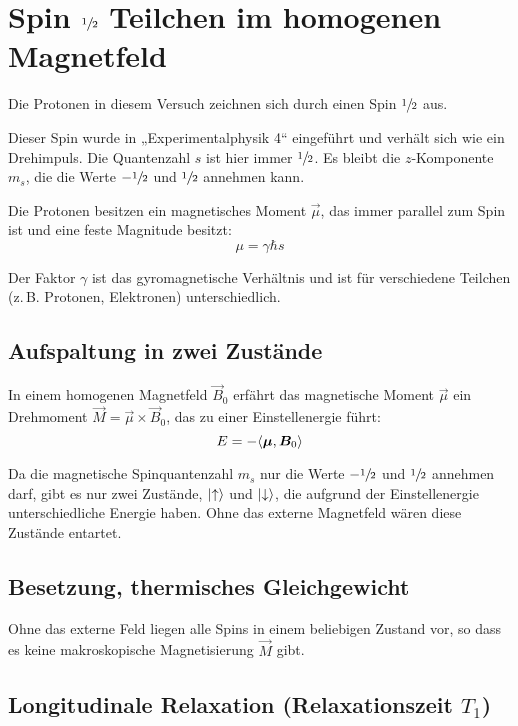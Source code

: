 \nocite{meschede-gerthsen_24}

\nocite{physik412-Anleitung}

\section{Spin $\sfrac12$ Teilchen im homogenen Magnetfeld}

Die Protonen in diesem Versuch zeichnen sich durch einen Spin $\sfrac12$ aus.

Dieser Spin wurde in „Experimentalphysik 4“ eingeführt und verhält sich wie ein
Drehimpuls. Die Quantenzahl $s$ ist hier immer $\sfrac12$. Es bleibt die
$z$-Komponente $m_s$, die die Werte $-\sfrac12$ und $\sfrac12$ annehmen kann.

Die Protonen besitzen ein magnetisches Moment $\vec\mu$, das immer parallel zum
Spin ist und eine feste Magnitude besitzt:
\[
    \mu = \gamma \hbar s
\]

Der Faktor $\gamma$ ist das gyromagnetische Verhältnis und ist für verschiedene
Teilchen (z.\,B. Protonen, Elektronen) unterschiedlich.

\subsection{Aufspaltung in zwei Zustände}

In einem homogenen Magnetfeld $\vec B_0$ erfährt das magnetische Moment
$\vec\mu$ ein Drehmoment $\vec M = \vec \mu \times \vec B_0$, das zu einer
Einstellenergie führt:
\[
    E = - \langle \boldsymbol{\mu}, \boldsymbol{B}_0 \rangle
\]

Da die magnetische Spinquantenzahl $m_s$ nur die Werte $-\sfrac12$ und
$\sfrac12$ annehmen darf, gibt es nur zwei Zustände, $\ket\uparrow$ und
$\ket\downarrow$, die aufgrund der Einstellenergie unterschiedliche Energie
haben. Ohne das externe Magnetfeld wären diese Zustände entartet.

\subsection{Besetzung, thermisches Gleichgewicht}

Ohne das externe Feld liegen alle Spins in einem beliebigen Zustand vor, so
dass es keine makroskopische Magnetisierung $\vec M$ gibt.

\subsection{Longitudinale Relaxation (Relaxationszeit $T_1$)}

